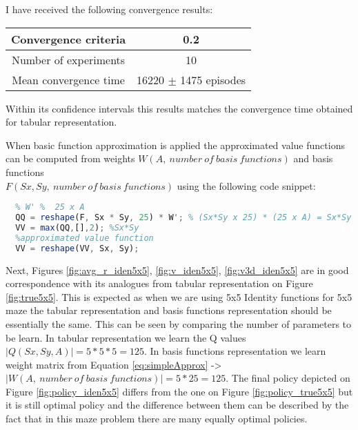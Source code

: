 \documentclass[a4paper,11pt]{article}
\theoremstyle{mytheor}
\begin{document}
I have received the following convergence results:

\begin{center}
	\begin{tabular}{| c | c | }
		\hline
		Convergence criteria &  0.2 \\ 
		\hline
		Number of experiments & 10 \\ 
		\hline
	    Mean convergence time & 16220 $\pm$ 1475 episodes \\
		\hline
	\end{tabular}
\end{center}

Within its confidence intervals this results matches the convergence time obtained for tabular representation. 

When basic function approximation is applied the approximated value functions can be computed from weights $W(A,\ number\ of\ basis \ functions)$ and basis functions \\
$F(Sx, Sy,\ number\ of\ basis \ functions)$ using the following code snippet:

\begin{lstlisting}[language=Octave]
  % reshape(F, Sx * Sy, 25) % Sx*Sy x 25  
  % W' %  25 x A
  QQ = reshape(F, Sx * Sy, 25) * W'; % (Sx*Sy x 25) * (25 x A) = Sx*Sy x A
  VV = max(QQ,[],2); %Sx*Sy
  %approximated value function
  VV = reshape(VV, Sx, Sy);
\end{lstlisting}


Next, Figures \ref{fig:avg_r_iden5x5}, \ref{fig:v_iden5x5}, \ref{fig:v3d_iden5x5} are in good correspondence with its analogues from tabular representation on Figure \ref{fig:true5x5}. This is expected as when we are using 5x5 Identity functions for 5x5 maze the tabular representation and basis functions representation should be essentially the same. This can be seen by comparing the number of parameters to be learn. 
In tabular representation we learn the Q values $|Q(Sx, Sy, A)|=5*5*5=125$. In basis functions representation we learn weight matrix from Equation \ref{eq:simpleApprox} -> $|W(A,\ number\ of\ basis \ functions)| = 5*25=125$.
The final policy depicted on Figure \ref{fig:policy_iden5x5} differs from the one on Figure \ref{fig:policy_true5x5} but it is still optimal policy and the difference between them can be described by the fact that in this maze problem there are many equally optimal policies. 
\end{document}
